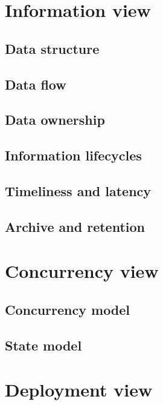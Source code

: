 \documentclass[a4paper,11pt]{report}
\begin{document}
\section{Information view}
\label{cha:information-view}


\subsection{Data structure}
\label{sec:data-structure}


\subsection{Data flow}
\label{sec:data-flow}


\subsection{Data ownership}
\label{sec:data-ownership}


\subsection{Information lifecycles}
\label{sec:inform-lifecycl}


\subsection{Timeliness and latency}
\label{sec:timeliness-latency}


\subsection{Archive and retention}
\label{sec:archive-retention}


\section{Concurrency view}
\label{sec:concurrency-view}


\subsection{Concurrency model}
\label{sec:concurrency-model}


\subsection{State model}
\label{sec:state-model}


\section{Deployment view}
\label{sec:deployment-view}
\end{document}
